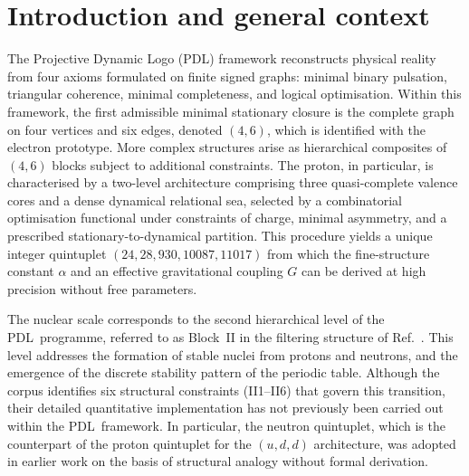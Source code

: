\documentclass[11pt,a4paper]{article}
\theoremstyle{definition}
\newcommand{\PDL}{\textnormal{PDL}}
\begin{document}
\section{Introduction and general context}
\label{sec:intro}

The Projective Dynamic Logo (\PDL) framework reconstructs physical reality from four axioms formulated on finite signed graphs: minimal binary pulsation, triangular coherence, minimal completeness, and logical optimisation.\cite{PDL_Main_2026,PDL_Intro_2026} Within this framework, the first admissible minimal stationary closure is the complete graph on four vertices and six edges, denoted $(4,6)$, which is identified with the electron prototype. More complex structures arise as hierarchical composites of $(4,6)$ blocks subject to additional constraints. The proton, in particular, is characterised by a two-level architecture comprising three quasi-complete valence cores and a dense dynamical relational sea, selected by a combinatorial optimisation functional under constraints of charge, minimal asymmetry, and a prescribed stationary-to-dynamical partition. This procedure yields a unique integer quintuplet $(24, 28, 930, 10087, 11017)$ from which the fine-structure constant $\alpha$ and an effective gravitational coupling $G$ can be derived at high precision without free parameters.\cite{Combinatorial_Proton_v2_2026,Alpha_PDL_v2_2026,Exponent_18_PDL_2026}

The nuclear scale corresponds to the second hierarchical level of the \PDL\ programme, referred to as Block~II in the filtering structure of Ref.~\cite{Exponent_18_PDL_2026}. This level addresses the formation of stable nuclei from protons and neutrons, and the emergence of the discrete stability pattern of the periodic table. Although the corpus identifies six structural constraints (II1--II6) that govern this transition, their detailed quantitative implementation has not previously been carried out within the \PDL\ framework. In particular, the neutron quintuplet, which is the counterpart of the proton quintuplet for the $(u,d,d)$ architecture, was adopted in earlier work on the basis of structural analogy without formal derivation.
\end{document}
